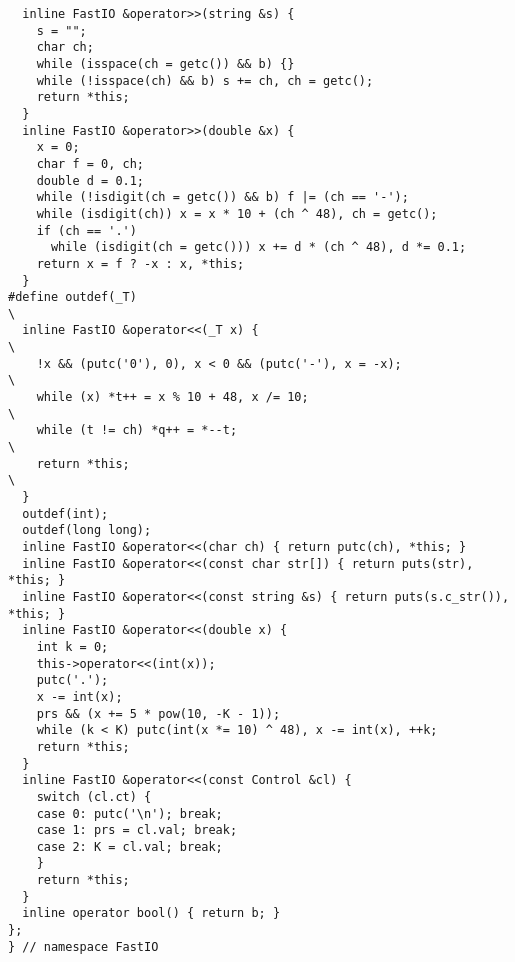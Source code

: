 \documentclass[twoside]{article}
\begin{document}
\begin{lstlisting}
  inline FastIO &operator>>(string &s) {
    s = "";
    char ch;
    while (isspace(ch = getc()) && b) {}
    while (!isspace(ch) && b) s += ch, ch = getc();
    return *this;
  }
  inline FastIO &operator>>(double &x) {
    x = 0;
    char f = 0, ch;
    double d = 0.1;
    while (!isdigit(ch = getc()) && b) f |= (ch == '-');
    while (isdigit(ch)) x = x * 10 + (ch ^ 48), ch = getc();
    if (ch == '.')
      while (isdigit(ch = getc())) x += d * (ch ^ 48), d *= 0.1;
    return x = f ? -x : x, *this;
  }
#define outdef(_T)                                                             \
  inline FastIO &operator<<(_T x) {                                            \
    !x && (putc('0'), 0), x < 0 && (putc('-'), x = -x);                        \
    while (x) *t++ = x % 10 + 48, x /= 10;                                     \
    while (t != ch) *q++ = *--t;                                               \
    return *this;                                                              \
  }
  outdef(int);
  outdef(long long);
  inline FastIO &operator<<(char ch) { return putc(ch), *this; }
  inline FastIO &operator<<(const char str[]) { return puts(str), *this; }
  inline FastIO &operator<<(const string &s) { return puts(s.c_str()), *this; }
  inline FastIO &operator<<(double x) {
    int k = 0;
    this->operator<<(int(x));
    putc('.');
    x -= int(x);
    prs && (x += 5 * pow(10, -K - 1));
    while (k < K) putc(int(x *= 10) ^ 48), x -= int(x), ++k;
    return *this;
  }
  inline FastIO &operator<<(const Control &cl) {
    switch (cl.ct) {
    case 0: putc('\n'); break;
    case 1: prs = cl.val; break;
    case 2: K = cl.val; break;
    }
    return *this;
  }
  inline operator bool() { return b; }
};
} // namespace FastIO

\end{lstlisting}
\end{document}
